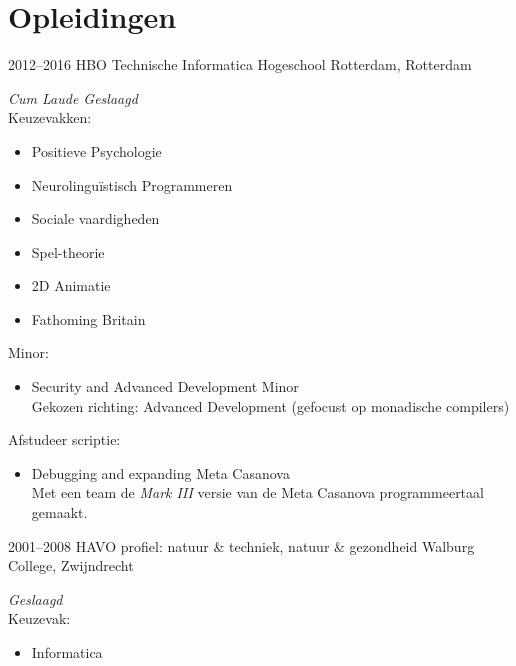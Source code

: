 \documentclass[]{friggeri-cv} %
\begin{document}

\section{Opleidingen}

\begin{entrylist}
   \entry
   {2012--2016}
   {HBO {\normalfont Technische Informatica}}
   {Hogeschool Rotterdam, Rotterdam}
   {\textit{Cum Laude Geslaagd} \\
      Keuzevakken:
      \setlength\multicolsep{0pt}
      \begin{multicols}{2}
         \begin{itemize}[topsep=0pt]
            \item Positieve Psychologie
            \item Neurolingu\"istisch Programmeren
            \item Sociale vaardigheden
            \item Spel-theorie
            \item 2D Animatie
            \item Fathoming Britain
         \end{itemize}
      \end{multicols}
      Minor:
      \begin{itemize}[topsep=0pt]
         \item Security and Advanced Development Minor\\
            Gekozen richting: Advanced Development (gefocust op monadische compilers)\\
      \end{itemize}
      Afstudeer scriptie:
      \begin{itemize}[topsep=0pt]
         \item Debugging and expanding Meta Casanova\\
            Met een team de \textit{Mark III} versie van de Meta Casanova programmeertaal gemaakt.
      \end{itemize}
   }
   \entry
   {2001--2008}
   {HAVO {\normalfont profiel: natuur \& techniek, natuur \& gezondheid}}
   {Walburg College, Zwijndrecht}
   {\textit{Geslaagd} \\
      Keuzevak:
      \begin{itemize}[topsep=0pt]
         \item Informatica
      \end{itemize}
   }
\end{entrylist}
\end{document}
